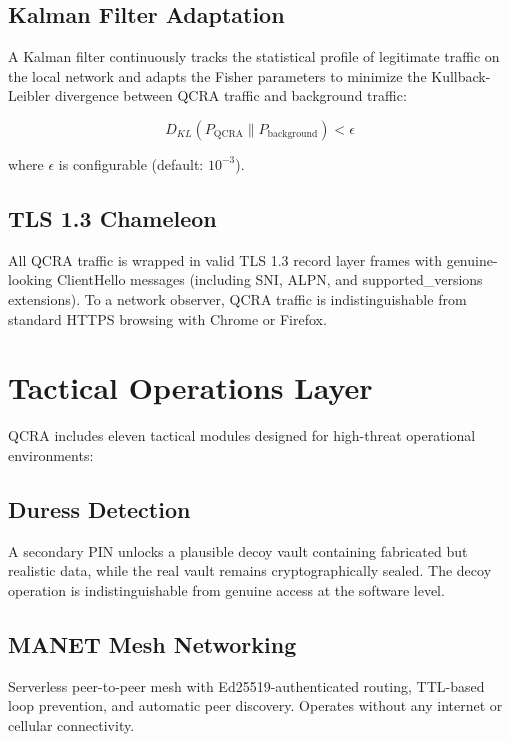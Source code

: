 \documentclass[11pt,a4paper]{article}
\begin{document}
\subsection{Kalman Filter Adaptation}

A Kalman filter continuously tracks the statistical profile of
legitimate traffic on the local network and adapts the Fisher
parameters to minimize the Kullback-Leibler divergence between QCRA
traffic and background traffic:

\begin{equation}
D_{KL}(P_{\text{QCRA}} \| P_{\text{background}}) < \epsilon
\end{equation}

where $\epsilon$ is configurable (default: $10^{-3}$).

\subsection{TLS 1.3 Chameleon}

All QCRA traffic is wrapped in valid TLS 1.3 record layer frames with
genuine-looking ClientHello messages (including SNI, ALPN, and
supported\_versions extensions). To a network observer, QCRA traffic
is indistinguishable from standard HTTPS browsing with Chrome or Firefox.

\section{Tactical Operations Layer}
\label{sec:tactical}

QCRA includes eleven tactical modules designed for high-threat
operational environments:

\subsection{Duress Detection}
A secondary PIN unlocks a plausible decoy vault containing fabricated
but realistic data, while the real vault remains cryptographically
sealed. The decoy operation is indistinguishable from genuine access
at the software level.

\subsection{MANET Mesh Networking}
Serverless peer-to-peer mesh with Ed25519-authenticated routing,
TTL-based loop prevention, and automatic peer discovery. Operates
without any internet or cellular connectivity.
\end{document}
